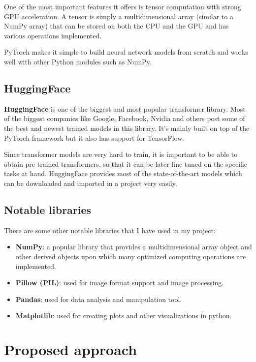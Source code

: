 \documentclass{report}[12pt, a4paper]
\begin{document}
One of the most important features it offers is tensor computation with strong GPU acceleration. A tensor is simply a multidimensional array (similar to a NumPy array) that can be stored on both the CPU and the GPU and has various operations implemented.

PyTorch makes it simple to build neural network models from scratch and works well with other Python modules such as NumPy.

\section{HuggingFace}

\textbf{HuggingFace} is one of the biggest and most popular transformer library. Most of the biggest companies like Google, Facebook, Nvidia and others post some of the best and newest trained models in this library. It's mainly built on top of the PyTorch framework but it also has support for TensorFlow.

Since transformer models are very hard to train, it is important to be able to obtain pre-trained transformers, so that it can be later fine-tuned on the specific tasks at hand. HuggingFace provides most of the state-of-the-art models which can be downloaded and imported in a project very easily.

\section{Notable libraries}

There are some other notable libraries that I have used in my project:
\begin{itemize}
    \item \textbf{NumPy}: a popular library that provides a multidimensional array object and other derived objects upon which many optimized computing operations are implemented.
    \item \textbf{Pillow (PIL)}: used for image format support and image processing.
    \item \textbf{Pandas}: used for data analysis and manipulation tool.
    \item \textbf{Matplotlib}: used for creating plots and other visualizations in python.
\end{itemize}

\chapter{Proposed approach}
\end{document}
